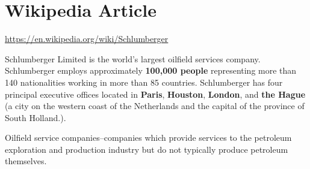 \documentclass[12pt,a4paper]{report}
\begin{document}
\section{Wikipedia Article}

\url{https://en.wikipedia.org/wiki/Schlumberger}

Schlumberger Limited is the world's largest oilfield services company.
Schlumberger employs approximately \textbf{100,000 people} representing more
than 140 nationalities working in more than 85 countries. Schlumberger has
four principal executive offices located in \textbf{Paris},
\textbf{Houston}, \textbf{London}, and \textbf{the Hague} (a city on the
western coast of the Netherlands and the capital of the province of South
Holland.).

Oilfield service companies--companies which provide services to the
petroleum exploration and production industry but do not typically produce
petroleum themselves. 
\end{document}
